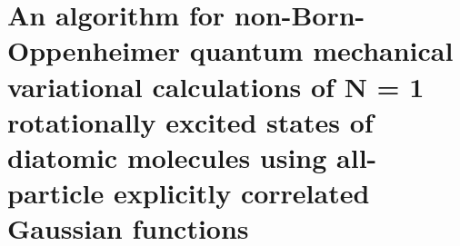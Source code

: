 \chapter{An algorithm for non-Born-Oppenheimer quantum mechanical variational calculations of N = 1 rotationally excited states of diatomic molecules using all-particle explicitly correlated Gaussian functions\label{apndx4}}



